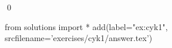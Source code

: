 
\begin{ex} 
  \label{ex:cyk1}
  
  \qed
\end{ex} 
\begin{python0}
from solutions import *
add(label="ex:cyk1",
    srcfilename='exercises/cyk1/answer.tex') 
\end{python0}
